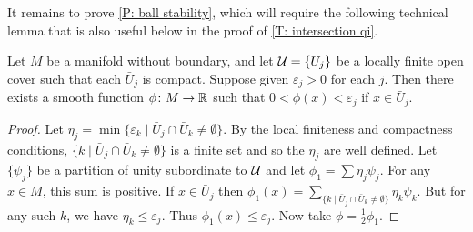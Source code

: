 It remains to prove \cref{P: ball stability}, which will require the following technical lemma that is also useful below in the proof of \cref{T: intersection qi}.

\begin{lemma}\label{L: minimizer}
	Let $M$ be a manifold without boundary, and let $\mathcal{U} = \{U_j\}$ be a locally finite open cover such that each $\bar U_j$ is compact.
	Suppose given $\varepsilon_j>0$ for each $j$.
	Then there exists a smooth function $\phi \colon M \to \mathbb{R}$ such that $0<\phi(x)<\varepsilon_j$ if $x \in \bar U_j$.
\end{lemma}

\begin{proof}
	Let $\eta_j = \min\{\varepsilon_k \mid \bar U_j \cap \bar U_k\neq \emptyset\}$.
	By the local finiteness and compactness conditions, $\{k \mid \bar U_j \cap \bar U_k\neq \emptyset\}$ is a finite set and so the $\eta_j$ are well defined.
	Let $\{\psi_j\}$ be a partition of unity subordinate to $\mathcal{U}$ and let $\phi_1 = \sum \eta_j\psi_j$.
	For any $x \in M$, this sum is positive.
	If $x \in \bar U_j$ then $\phi_1(x) = \sum_{\{k \mid \bar U_j \cap \bar U_k\neq \emptyset\}} \eta_k\psi_k$.
	But for any such $k$, we have $\eta_k \leq \varepsilon_j$.
	Thus $\phi_1(x) \leq \varepsilon_j$.
	Now take $\phi = \frac{1}{2}\phi_1$.
\end{proof}

